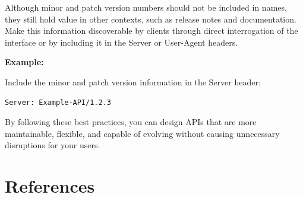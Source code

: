 \documentclass{article}
\begin{document}
Although minor and patch version numbers should not be included in names, they still hold value in other contexts, such as release notes and documentation. Make this information discoverable by clients through direct interrogation of the interface or by including it in the Server or User-Agent headers.

\textbf{Example:}

Include the minor and patch version information in the Server header:

\begin{verbatim}
Server: Example-API/1.2.3
\end{verbatim}

By following these best practices, you can design APIs that are more maintainable, flexible, and capable of evolving without causing unnecessary disruptions for your users.

\section{References}
\printbibliography[heading=none]
\end{document}
